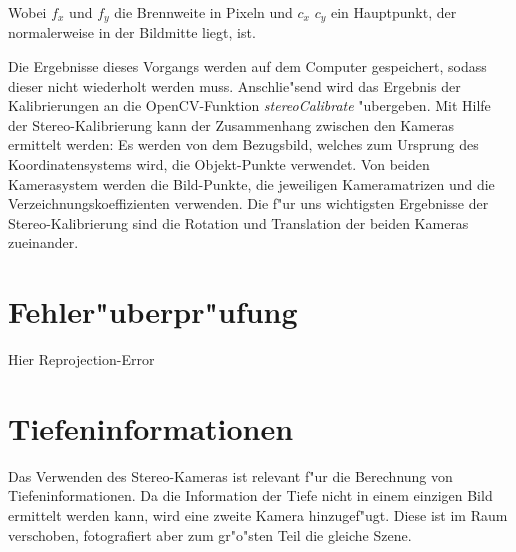 \newpage

\noindent Wobei $f_{x}$ und $f_{y}$ die Brennweite in Pixeln und $c_{x}$ $c_{y}$ ein Hauptpunkt, der normalerweise in der Bildmitte liegt, ist.

\noindent Die Ergebnisse dieses Vorgangs werden auf dem Computer gespeichert, sodass dieser nicht wiederholt werden muss. Anschlie"send wird das Ergebnis der Kalibrierungen an die OpenCV-Funktion \textit{stereoCalibrate} "ubergeben.\newline
Mit Hilfe der Stereo-Kalibrierung kann der Zusammenhang zwischen den Kameras ermittelt werden: Es werden von dem Bezugsbild, welches zum Ursprung des Koordinatensystems wird, die Objekt-Punkte verwendet. Von beiden Kamerasystem werden die Bild-Punkte, die jeweiligen Kameramatrizen und die Verzeichnungskoeffizienten verwenden.\newline
Die f"ur uns wichtigsten Ergebnisse der Stereo-Kalibrierung sind die Rotation und Translation der beiden Kameras zueinander.

\section{Fehler"uberpr"ufung}
\label{sec:fehlertest}

Hier Reprojection-Error

\section{Tiefeninformationen}
\label{sec:tiefeninformationen}

\noindent Das Verwenden des Stereo-Kameras ist relevant f"ur die Berechnung von Tiefeninformationen. Da die Information der Tiefe nicht in einem einzigen Bild ermittelt werden kann, wird eine zweite Kamera hinzugef"ugt. Diese ist im Raum verschoben, fotografiert aber zum gr"o"sten Teil die gleiche Szene.

